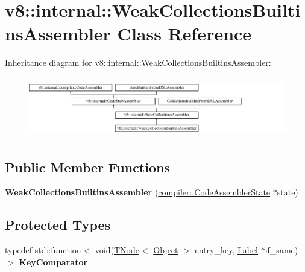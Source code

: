 \hypertarget{classv8_1_1internal_1_1WeakCollectionsBuiltinsAssembler}{}\section{v8\+:\+:internal\+:\+:Weak\+Collections\+Builtins\+Assembler Class Reference}
\label{classv8_1_1internal_1_1WeakCollectionsBuiltinsAssembler}
Inheritance diagram for v8\+:\+:internal\+:\+:Weak\+Collections\+Builtins\+Assembler\+:\begin{figure}[H]
\begin{center}
\leavevmode
\includegraphics[height=2.666667cm]{classv8_1_1internal_1_1WeakCollectionsBuiltinsAssembler}
\end{center}
\end{figure}
\subsection*{Public Member Functions}
\begin{DoxyCompactItemize}
\item 
\mbox{\label{classv8_1_1internal_1_1WeakCollectionsBuiltinsAssembler_a25badc1f2caf9abbd48edcbfb608d0d4}} 
{\bfseries Weak\+Collections\+Builtins\+Assembler} (\mbox{\hyperlink{classv8_1_1internal_1_1compiler_1_1CodeAssemblerState}{compiler\+::\+Code\+Assembler\+State}} $\ast$state)
\end{DoxyCompactItemize}
\subsection*{Protected Types}
\begin{DoxyCompactItemize}
\item 
\mbox{\label{classv8_1_1internal_1_1WeakCollectionsBuiltinsAssembler_ad06af8e4e6dffd179e5a030400246f49}} 
typedef std\+::function$<$ void(\mbox{\hyperlink{classv8_1_1internal_1_1compiler_1_1TNode}{T\+Node}}$<$ \mbox{\hyperlink{classv8_1_1internal_1_1Object}{Object}} $>$ entry\+\_\+key, \mbox{\hyperlink{classv8_1_1internal_1_1compiler_1_1CodeAssemblerLabel}{Label}} $\ast$if\+\_\+same)$>$ {\bfseries Key\+Comparator}
\end{DoxyCompactItemize}
